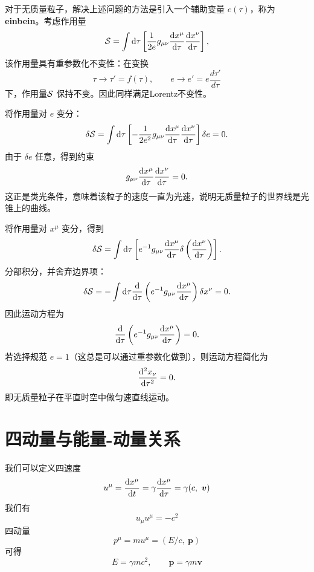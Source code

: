 \documentclass[a4paper]{report}
\begin{document}
对于无质量粒子，解决上述问题的方法是引入一个辅助变量 \(e(\tau)\)，称为\textbf{einbein}。考虑作用量
\begin{equation}
    \mathcal{S} =  \int \mathrm{d}\tau \left[ \frac{1}{2e} g_{\mu\nu}\frac{\mathrm{d} x^\mu}{\mathrm{d}\tau}\frac{\mathrm{d} x^\nu}{\mathrm{d}\tau} \right],
\end{equation}
该作用量具有重参数化不变性：在变换
\begin{equation}
    \tau \to \tau' = f(\tau), \qquad e \to e' = e \frac{d\tau'}{d\tau}
\end{equation}
下，作用量\(\mathcal{S}\) 保持不变。因此同样满足Lorentz不变性。

将作用量对 \(e\) 变分：
\[
\delta \mathcal{S} =  \int \mathrm{d}\tau \left[ -\frac{1}{2e^2} g_{\mu\nu}\frac{\mathrm{d} x^\mu}{\mathrm{d}\tau}\frac{\mathrm{d} x^\nu}{\mathrm{d}\tau} \right]\delta e = 0.
\]
由于 \(\delta e\) 任意，得到约束
\[
g_{\mu\nu}\frac{\mathrm{d} x^\mu}{\mathrm{d}\tau}\frac{\mathrm{d} x^\nu}{\mathrm{d}\tau} = 0.
\]
这正是类光条件，意味着该粒子的速度一直为光速，说明无质量粒子的世界线是光锥上的曲线。

将作用量对 \(x^\mu\) 变分，得到
\[
\delta \mathcal{S} = \int \mathrm{d}\tau \left[ e^{-1} g_{\mu\nu}\frac{\mathrm{d} x^\mu}{\mathrm{d}\tau} \delta\left(  \frac{\mathrm{d} x^\nu}{\mathrm{d}\tau} \right) \right].
\]
分部积分，并舍弃边界项：
\[
\delta \mathcal{S} = - \int \mathrm{d}\tau \frac{\mathrm{d}}{\mathrm{d}\tau}\left( e^{-1} g_{\mu\nu}  \frac{\mathrm{d} x^\mu}{\mathrm{d}\tau} \right) \delta x^\nu = 0.
\]
因此运动方程为
\[
\frac{\mathrm{d}}{\mathrm{d}\tau}\left( e^{-1} g_{\mu\nu} \frac{\mathrm{d} x^\mu}{\mathrm{d}\tau} \right) = 0.
\]
若选择规范 \(e=1\)（这总是可以通过重参数化做到），则运动方程简化为
\[
\frac{\mathrm{d}^2 x_\nu}{\mathrm{d}\tau^2} = 0.
\]
即无质量粒子在平直时空中做匀速直线运动。

\section{四动量与能量-动量关系}


我们可以定义四速度
\begin{equation}
    u^\mu = \frac{\mathrm{d} x^\mu}{\mathrm{d} t} = \gamma\frac{\mathrm{d} x^\mu}{\mathrm{d} \tau} = \gamma(c,~\boldsymbol{v}) 
\end{equation}
我们有
\begin{equation}
    u_\mu u^\mu = -c^2
\end{equation}
四动量
\begin{equation}
    p^\mu = m u^\mu = (E/c,~ \boldsymbol{p})
\end{equation}
可得
\begin{equation}
    E = \gamma m c^2,\qquad \boldsymbol{p} = \gamma m\boldsymbol{v}
\end{equation}
\end{document}

